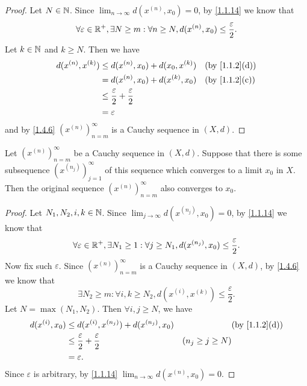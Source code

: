 \begin{proof}
  Let \(N \in \mathbb{N}\).
  Since \(\lim_{n \to \infty} d(x^{(n)}, x_0) = 0\), by \cref{1.1.14} we know that
  \[
    \forall \varepsilon \in \mathbb{R}^+, \exists N \geq m : \forall n \geq N, d(x^{(n)}, x_0) \leq \dfrac{\varepsilon}{2}.
  \]
  Let \(k \in \mathbb{N}\) and \(k \geq N\).
  Then we have
  \begin{align*}
    d(x^{(n)}, x^{(k)}) & \leq d(x^{(n)}, x_0) + d(x_0, x^{(k)})               &  & \text{(by \cref{1.1.2}(d))} \\
                        & = d(x^{(n)}, x_0) + d(x^{(k)}, x_0)                  &  & \text{(by \cref{1.1.2}(c))} \\
                        & \leq \dfrac{\varepsilon}{2} + \dfrac{\varepsilon}{2}                                  \\
                        & = \varepsilon
  \end{align*}
  and by \cref{1.4.6} \((x^{(n)})_{n = m}^\infty\) is a Cauchy sequence in \((X, d)\).
\end{proof}

\setcounter{thm}{8}
\begin{lem}\label{1.4.9}
  Let \((x^{(n)})_{n = m}^\infty\) be a Cauchy sequence in \((X, d)\).
  Suppose that there is some subsequence \((x^{(n_j)})_{j = 1}^\infty\) of this sequence which converges to a limit \(x_0\) in \(X\).
  Then the original sequence \((x^{(n)})_{n = m}^\infty\) also converges to \(x_0\).
\end{lem}

\begin{proof}
  Let \(N_1, N_2, i, k \in \mathbb{N}\).
  Since \(\lim_{j \to \infty} d(x^{(n_j)}, x_0) = 0\), by \cref{1.1.14} we know that
  \[
    \forall \varepsilon \in \mathbb{R}^+, \exists N_1 \geq 1 : \forall j \geq N_1, d(x^{(n_j)}, x_0) \leq \dfrac{\varepsilon}{2}.
  \]
  Now fix such \(\varepsilon\).
  Since \((x^{(n)})_{n = m}^\infty\) is a Cauchy sequence in \((X, d)\), by \cref{1.4.6} we know that
  \[
    \exists N_2 \geq m : \forall i, k \geq N_2, d(x^{(i)}, x^{(k)}) \leq \dfrac{\varepsilon}{2}.
  \]
  Let \(N = \max(N_1, N_2)\).
  Then \(\forall i, j \geq N\), we have
  \begin{align*}
    d(x^{(i)}, x_0) & \leq d(x^{(i)}, x^{(n_j)}) + d(x^{(n_j)}, x_0)       &                     & \text{(by \cref{1.1.2}(d))} \\
                    & \leq \dfrac{\varepsilon}{2} + \dfrac{\varepsilon}{2} & (n_j \geq j \geq N)                               \\
                    & = \varepsilon.
  \end{align*}
  Since \(\varepsilon\) is arbitrary, by \cref{1.1.14} \(\lim_{n \to \infty} d(x^{(n)}, x_0) = 0\).
\end{proof}

